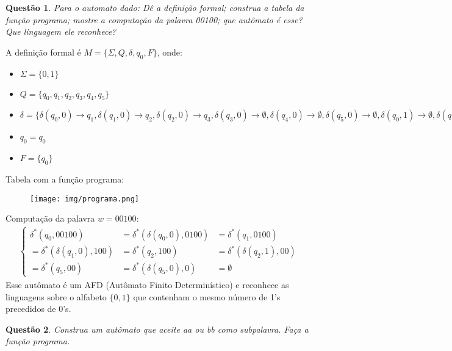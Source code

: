 \documentclass{article}
\newtheorem{problem}{Questão}
\begin{document}
    \begin{problem}
        Para o automato dado: Dê a definição formal; construa a tabela da função programa; mostre a computação da palavra 00100; que autômato é esse? Que linguagem ele reconhece?
        
        
    \end{problem}
    \begin{solution} A definição formal é $M = \{\Sigma, Q, \delta, q_0, F\}$, onde:
    \begin{itemize}
        \item $\Sigma = \{0,1\}$
        \item $Q = \{q_0, q_1, q_2, q_3, q_4, q_5\}$
        \item $\delta = \{\delta(q_0,0) \rightarrow q_1, \delta(q_1,0) \rightarrow q_2, \delta(q_2,0) \rightarrow q_3, \delta(q_3,0) \rightarrow \emptyset, \delta(q_4,0) \rightarrow \emptyset, \delta(q_5,0) \rightarrow \emptyset, \delta(q_0,1) \rightarrow \emptyset, \delta(q_1,1) \rightarrow \emptyset, \delta(q_2,1) \rightarrow q_5, \delta(q_3,1) \rightarrow q_4, \delta(q_4,1) \rightarrow q_5, \delta(q_5,1) \rightarrow q_0\}$
        \item $q_0 = q_0$
        \item $F = \{q_0\}$
    \end{itemize}
    Tabela com a função programa:
    \begin{figure}[H]
        \centering
        \texttt{[image: img/programa.png]}
        \label{fig:my_label}
    \end{figure}
    \noindent Computação da palavra $w = 00100$:
\begin{align*}
    \left\{\begin{matrix}
\delta^{*}(q_0,00100) & = \delta^{*}(\delta(q_0, 0),0100) & = \delta^{*}(q_1,0100) \\ 
= \delta^{*}(\delta(q_1, 0),100) & = \delta^{*}(q_2,100) & = \delta^{*}(\delta(q_2, 1),00)\\ 
= \delta^{*}(q_5,00) & = \delta^{*}(\delta(q_5, 0),0) & = \emptyset
\end{matrix}\right.
\end{align*}
Esse autômato é um AFD (Autômato Finito Determinístico) e reconhece as linguagens sobre o alfabeto $\{0,1\}$ que contenham o mesmo número de 1's precedidos de 0's.
    \end{solution}
    
    
    
    
    \begin{problem}
        Construa um autômato que aceite aa ou bb como subpalavra. Faça a função programa.
    \end{problem}
    
\end{document}
